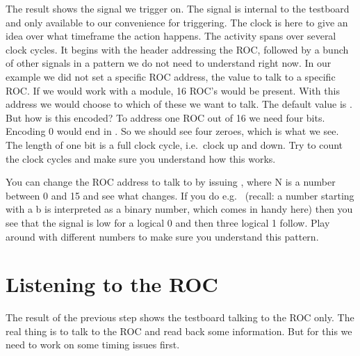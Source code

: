 The result shows the signal we trigger on. The  signal is internal to the testboard and only available to our convenience  for triggering. The clock is here to give an idea over what timeframe the action happens. The activity spans over several clock cycles. It begins with the header addressing the ROC, followed by a bunch of other signals in a pattern we do not need to understand right now. In our example we did not set a specific ROC address, the value to talk to a specific ROC. If we would work with a module, 16 ROC's would be present. With this address we would choose to which of these we want to talk. The default value is . But how is this encoded? To address one ROC out of 16 we need four bits. Encoding 0 would end in . So we should see four zeroes, which is what we see. The length of one bit is a full clock cycle, i.e.~clock up and down. Try to count the clock cycles and make sure you understand how this works.

You can change the ROC address to talk to by issuing , where N is a number between 0 and 15 and see what changes. If you do e.g.~ (recall: a number starting with a b is interpreted as a binary number, which comes in handy here) then you see that the signal is low for a logical 0 and then three logical 1 follow. Play around with different numbers to make sure you understand this pattern.

\section{Listening to the ROC}
The result of the previous step shows the testboard talking to the ROC only. The real thing is to talk to the ROC and read back some information. But for this we need to work on some timing issues first.

